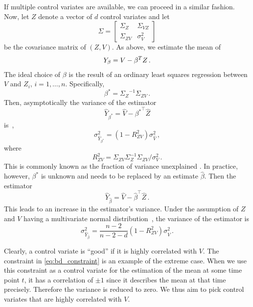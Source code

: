 If multiple control variates are available, we can proceed in a similar fashion.
Now, let ${Z}$ denote a vector of $d$ control variates and let
\[
\Sigma=
\begin{bmatrix}
\Sigma_{ Z} & \Sigma_{V Z}\\
\Sigma_{ Z V} & \sigma_V^2
\end{bmatrix}
\]
be the covariance matrix of $({Z},V)$.
As above, we estimate the mean of
\[
    {Y}_{\beta}=V -{\beta}^{T}{Z}\,.
    \]
The ideal choice of $\beta$ is the result of an ordinary least squares regression between $V$
and $Z_i$, $i=1,\dots,n$.
Specifically,
\[
	\beta^{*}={\Sigma_{ Z}}^{-1}{\Sigma}_{ Z V}\,.
\]
Then, asymptotically
the variance of the estimator
\begin{equation}
\hat{Y}_{{\beta^*}}=\hat{V}-{\beta^*}^{\top}\hat{ Z}
\end{equation}
is~\parencite{szechtman2003control},
\begin{equation}\label{eq:lcv_asym}
    {\sigma_{\hat Y_{\beta^*}}^2} = (1 - R_{ Z V}^2){\sigma_{\hat V}^2}\,,
\end{equation}
where
\begin{equation*}
    R_{ Z V}^2=\Sigma_{ Z V}\Sigma_{ Z}^{-1}\Sigma_{ Z V} / \sigma_V^2\,.
\end{equation*}
This is commonly known as the fraction of variance unexplained \parencite{freedman2009statistical}.
In practice, however, $\beta^*$ is unknown and needs to be replaced by
an estimate $\hat{\beta}$.
Then the estimator
\begin{equation}
\hat{Y}_{\hat{\beta}}=\hat{V}-\hat{\beta}^{\top}\hat{ Z}\,.
\end{equation}
This leads to an increase in the estimator's variance.
Under the assumption of $Z$ and $V$ having a multivariate normal
distribution~\parencite{cheng1978analysis,lavenberg1982statistical}, the variance of the estimator is
\begin{equation}\label{eq:lcv_norm_varred}
    {\sigma_{\hat{Y}_{\hat{\beta}}}^2} = \frac{n - 2}{n - 2 - d}(1 - R_{ ZV}^2){\sigma_{\hat V}^2}\,.
\end{equation}

Clearly, a control  variate is ``good'' if it is highly correlated with $V$.
The constraint in \eqref{eq:bd_constraint} is an example of the extreme case.
When we use this constraint as a control variate
for the estimation of the mean at some time point $t$, it has a correlation of $\pm1$
since it describes the mean at that time precisely.
Therefore the variance is reduced to zero.
We thus aim to pick control  variates that are highly correlated with $V$.

